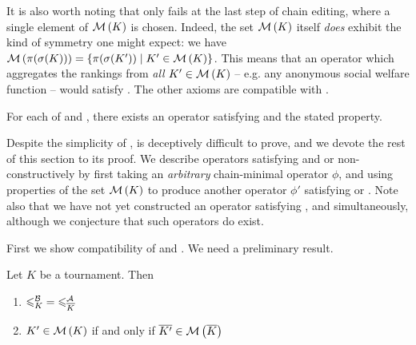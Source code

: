 It is also worth noting that  only fails at the last step of
chain editing, where a single element of $\operatorname{\mathcal{M}}\left({K}\right)$ is chosen. Indeed, the set
$\operatorname{\mathcal{M}}\left({K}\right)$ itself \emph{does} exhibit the kind of symmetry one might expect:
we have $\operatorname{\mathcal{M}}\left({\pi(\sigma(K))}\right) = \{\pi(\sigma(K')) \mid K' \in \operatorname{\mathcal{M}}\left({K}\right)\}$.
This means that an operator which aggregates the rankings from \emph{all} $K'
\in \operatorname{\mathcal{M}}\left({K}\right)$ -- e.g. any anonymous social welfare function --
would satisfy . The other axioms are compatible with
.

\begin{theorem}
    \label{tourn_result_chainmin_axiom_compatibilities}

    For each of  and , there exists an operator
    satisfying  and the stated property.

\end{theorem}

Despite the simplicity of ,
 is deceptively difficult to
prove, and we devote the rest of this section to its proof. We describe
operators satisfying  and  or 
non-constructively by first taking an \emph{arbitrary} chain-minimal operator
$\phi$, and using properties of the set $\operatorname{\mathcal{M}}\left({K}\right)$ to produce another operator
$\phi'$ satisfying  or . Note also that we have
not yet constructed an operator satisfying ,  and
 simultaneously, although we conjecture that such operators
do exist.

First we show compatibility of  and . We
need a preliminary result.

\begin{lemma}
    \label{tourn_result_chainmin_dual_lemma}
    Let $K$ be a tournament. Then
    \begin{enumerate}
        \item ${\leqslant^{\mathcal{B}}_K} = {\leqslant^{\mathcal{A}}_{{\overline{K}}}}$ \label{tourn_item_dual_lemma_nle}
        \item $K' \in \operatorname{\mathcal{M}}\left({K}\right)$ if and only if ${\overline{K'}} \in
              \operatorname{\mathcal{M}}\left({{\overline{K}}}\right)$
              \label{tourn_item_dual_lemma_minch}
    \end{enumerate}
\end{lemma}

